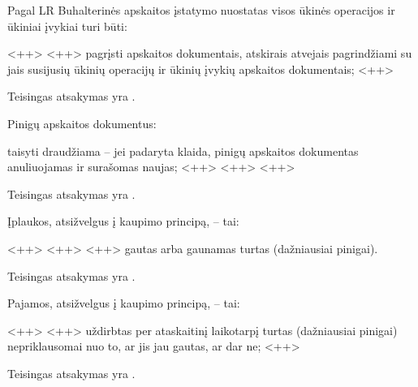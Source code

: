 \begin{tasks}
  \begin{task}
    \begin{condition}
      Pagal LR Buhalterinės apskaitos įstatymo nuostatas visos
      ūkinės operacijos ir ūkiniai įvykiai turi būti:
      \begin{enumerate}
         <++>
         <++>
         pagrįsti apskaitos dokumentais, atskirais atvejais
          pagrindžiami su jais susijusių ūkinių operacijų ir ūkinių
          įvykių apskaitos dokumentais;
         <++>
      \end{enumerate}
    \end{condition}
    \begin{solution}
      Teisingas atsakymas yra .
    \end{solution}
  \end{task}

  \begin{task}
    \begin{condition}
      Pinigų apskaitos dokumentus:
      \begin{enumerate}
         taisyti draudžiama – jei padaryta klaida, pinigų
          apskaitos dokumentas anuliuojamas ir surašomas naujas;
         <++>
         <++>
         <++>
      \end{enumerate}
    \end{condition}
    \begin{solution}
      Teisingas atsakymas yra .
    \end{solution}
  \end{task}

  \begin{task}
    \begin{condition}
      Įplaukos, atsižvelgus į kaupimo principą, – tai:
      \begin{enumerate}
         <++>
         <++>
         <++>
         gautas arba gaunamas turtas (dažniausiai pinigai).
      \end{enumerate}
    \end{condition}
    \begin{solution}
      Teisingas atsakymas yra .
    \end{solution}
  \end{task}

  \begin{task}
    \begin{condition}
      Pajamos, atsižvelgus į kaupimo principą, – tai:
      \begin{enumerate}
         <++>
         <++>
         uždirbtas per ataskaitinį laikotarpį turtas
          (dažniausiai pinigai) nepriklausomai nuo to, ar jis jau gautas,
          ar dar ne;
         <++>
      \end{enumerate}
    \end{condition}
    \begin{solution}
      Teisingas atsakymas yra .
    \end{solution}
  \end{task}


\end{tasks}
